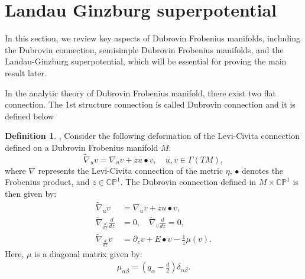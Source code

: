 \documentclass{article}
\theoremstyle{definition}
\newtheorem{definition}{Definition}[section]
\begin{document}
\section{Landau Ginzburg superpotential}

In this section, we review key aspects of Dubrovin Frobenius manifolds, including the Dubrovin connection, semisimple Dubrovin Frobenius manifolds, and the Landau-Ginzburg superpotential, which will be essential for proving the main result later.

In the analytic theory of Dubrovin Frobenius manifold, there exist two flat connection. The 1st structure connection is  called Dubrovin connection and it is defined below


\begin{definition}\cite{B. Dubrovin2},\cite{B. Dubrovin3}
Consider the following deformation of the Levi-Civita connection defined on a Dubrovin Frobenius manifold $M$:
\begin{equation*}
\tilde{\nabla}_{u}v = \nabla_{u}v + zu\bullet v, \quad u,v\in \Gamma(TM),
\end{equation*}
where $\nabla$ represents the Levi-Civita connection of the metric $\eta$, $\bullet$ denotes the Frobenius product, and $z\in \mathbb{CP}^1$. The Dubrovin connection defined in $M\times\mathbb{CP}^1$ is then given by:
\begin{equation}\label{Dubrovin Connection}
\begin{split}
\tilde{\nabla}_{u}v &= \nabla_{u}v + zu\bullet v,\\
\tilde{\nabla}_{\frac{d}{dz}}\frac{d}{dz} &= 0, \quad \tilde{\nabla}_{v} \frac{d}{dz} = 0,\\
\tilde{\nabla}_{\frac{d}{dz}}v &= \partial_{z}v + E\bullet v - \frac{1}{z}\mu(v).
\end{split}
\end{equation}
Here, $\mu$ is a diagonal matrix given by:
\begin{equation*}
\begin{split}
\mu_{\alpha\beta} = \left(q_{\alpha}-\frac{d}{2}\right)\delta_{\alpha\beta}.
\end{split}
\end{equation*}
\end{definition}
\end{document}
